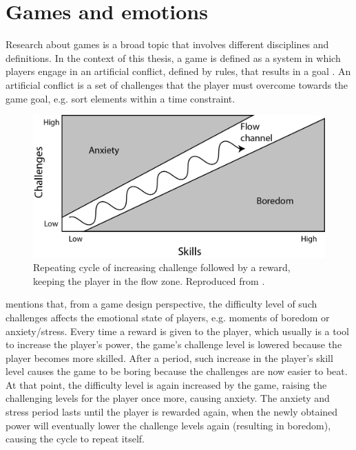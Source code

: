\chapter{Games and emotions}
\label{ch:literature-games}

Research about games is a broad topic that involves different disciplines and definitions. In the context of this thesis, a game is defined as a system in which players engage in an artificial conflict, defined by rules, that results in a goal \parencite{salen2004rules}. An artificial conflict is a set of challenges that the player must overcome towards the game goal, e.g. sort elements within a time constraint.

\begin{figure}[h!]
    \centering
    \includegraphics[scale=0.8]{Content/figures/flow-schell.png}
    \caption{Repeating cycle of increasing challenge followed by a reward, keeping the player in the flow zone. Reproduced from \textcite{schell2014art}.}
    \label{fig:flow-schell}
\end{figure}

\textcite{schell2014art} mentions that, from a game design perspective, the difficulty level of such challenges affects the emotional state of players, e.g. moments of boredom or anxiety/stress. Every time a reward is given to the player, which usually is a tool to increase the player's power, the game's challenge level is lowered because the player becomes more skilled. After a period, such increase in the player's skill level causes the game to be boring because the challenges are now easier to beat. At that point, the difficulty level is again increased by the game, raising the challenging levels for the player once more, causing anxiety. The anxiety and stress period lasts until the player is rewarded again, when the newly obtained power will eventually lower the challenge levels again (resulting in boredom), causing the cycle to repeat itself.

